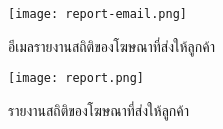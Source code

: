 \begin{figure}[!h]
	\centering
	\texttt{[image: report-email.png]}  
	\caption{อีเมลรายงานสถิติของโฆษณาที่ส่งให้ลูกค้า}
	\label{Fig:report-email}
\end{figure}

\begin{figure}[!p]
	\centering
	\texttt{[image: report.png]}  
	\caption{รายงานสถิติของโฆษณาที่ส่งให้ลูกค้า}
	\label{Fig:report}
\end{figure}
